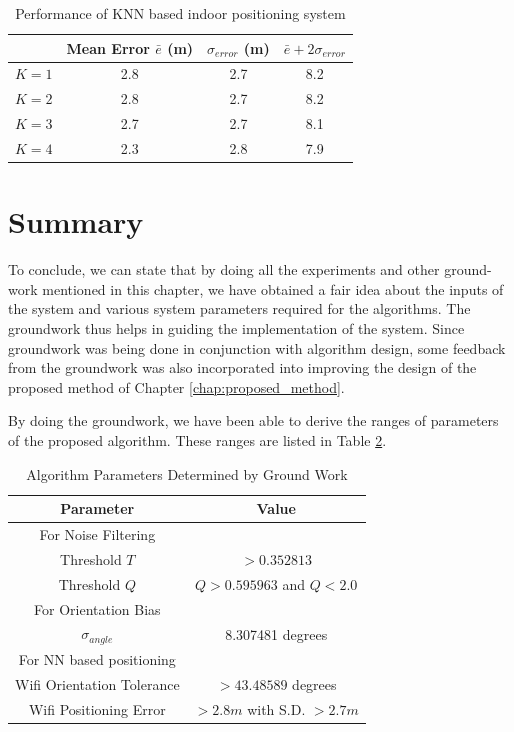 \begin{table}[h]
    \centering
    \caption{Performance of KNN based indoor positioning system \label{tab:knnperf}}
    \begin{tabular}{|l|c|c|c|}
    \hline
              & Mean Error $\bar{e}$ (m) & $\sigma_{error}$ (m) & $\bar{e} + 2 \sigma_{error}$ \\
    \hline
    \hline
    $K = 1$    & 2.8 & 2.7 & 8.2 \\
    $K = 2$    & 2.8 & 2.7 & 8.2 \\
    $K = 3$    & 2.7 & 2.7 & 8.1 \\
    $K = 4$    & 2.3 & 2.8 & 7.9 \\
    \hline
    \end{tabular}

\end{table}

\section{Summary}

To conclude, we can state that by doing all the experiments and other 
ground-work mentioned in this chapter, we have obtained a fair idea 
about the inputs of the system and various system parameters required
for the algorithms. The groundwork thus helps in guiding the implementation of
the system. Since groundwork was being done in conjunction with algorithm
design, some feedback from the groundwork was also incorporated into improving
the design of the proposed method of Chapter \ref{chap:proposed_method}.

By doing the groundwork, we have been able to derive the ranges of parameters of 
the proposed algorithm. These ranges are listed in Table \ref{tbl:algo_params}.

\begin{table}
\centering
\begin{tabular}{c c}
\hline
\hline
Parameter & Value\\
\hline
For Noise Filtering & \\
Threshold $T$ & $> 0.352813$\\
Threshold $Q$ & $Q > 0.595963$ and $Q < 2.0$\\
\hline
For Orientation Bias & \\
$\sigma_{angle}$ & 8.307481 degrees\\
\hline
For NN based positioning & \\
Wifi Orientation Tolerance & $> 43.48589$ degrees\\
Wifi Positioning Error & $> 2.8 m$ with S.D. $> 2.7 m$\\
\hline
\end{tabular}
\caption{Algorithm Parameters Determined by Ground Work\label{tbl:algo_params}}
\end{table}
